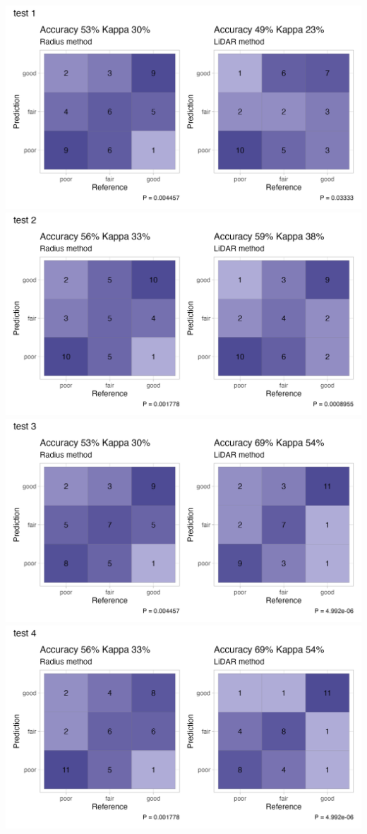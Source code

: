 \documentclass[12pt,twoside]{reedthesis}
\begin{document}
\includegraphics[width=0.85\linewidth]{figure/test1}
\includegraphics[width=0.85\linewidth]{figure/test2}
\includegraphics[width=0.85\linewidth]{figure/test3}
\includegraphics[width=0.85\linewidth]{figure/test4}
\end{document}
